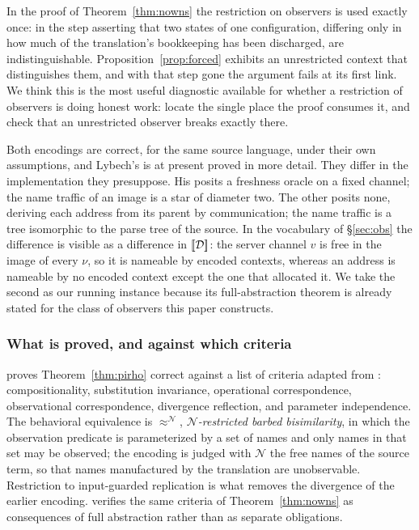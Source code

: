 \documentclass{article}
\begin{document}
\begin{remark}
\label{rem:usedonce}
    In the proof of Theorem~\ref{thm:nowns} the restriction on observers is used exactly once: in the step asserting that two states of one configuration, differing only in how much of the translation's bookkeeping has been discharged, are indistinguishable. Proposition~\ref{prop:forced} exhibits an unrestricted context that distinguishes them, and with that step gone the argument fails at its first link. We think this is the most useful diagnostic available for whether a restriction of observers is doing honest work: locate the single place the proof consumes it, and check that an unrestricted observer breaks exactly there.
\end{remark}

\begin{remark}
    Both encodings are correct, for the same source language, under their own assumptions, and Lybech's is at present proved in more detail. They differ in the implementation they presuppose. His posits a freshness oracle on a fixed channel; the name traffic of an image is a star of diameter two. The other posits none, deriving each address from its parent by communication; the name traffic is a tree isomorphic to the parse tree of the source. In the vocabulary of \S\ref{sec:obs} the difference is visible as a difference in $[\![\mathcal{D}]\!]$: the server channel $v$ is free in the image of every $\nu$, so it is nameable by encoded contexts, whereas an address is nameable by no encoded context except the one that allocated it. We take the second as our running instance because its full-abstraction theorem is already stated for the class of observers this paper constructs.
\end{remark}

\subsubsection*{What is proved, and against which criteria}

\citet{lybech} proves Theorem~\ref{thm:pirho} correct against a list of criteria adapted from \citet{gorla}: compositionality, substitution invariance, operational correspondence, observational correspondence, divergence reflection, and parameter independence. The behavioral equivalence is $\approx^{\mathcal{N}}$, \emph{$\mathcal{N}$-restricted barbed bisimilarity}, in which the observation predicate is parameterized by a set of names and only names in that set may be observed; the encoding is judged with $\mathcal{N}$ the free names of the source term, so that names manufactured by the translation are unobservable. Restriction to input-guarded replication is what removes the divergence of the earlier encoding.  verifies the same criteria of Theorem~\ref{thm:nowns} as consequences of full abstraction rather than as separate obligations.
\end{document}
